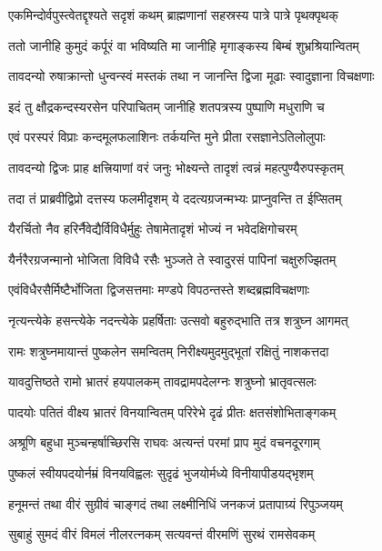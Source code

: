 \twolineshloka
{एकमिन्दोर्वपुस्त्वेतद्दृश्यते सदृशं कथम्}
{ब्राह्मणानां सहस्रस्य पात्रे पात्रे पृथक्पृथक्}%

\twolineshloka
{ततो जानीहि कुमुदं कर्पूरं वा भविष्यति}
{मा जानीहि मृगाङ्कस्य बिम्बं शुभ्रश्रियान्वितम्}%

\twolineshloka
{तावदन्यो रुषाक्रान्तो धुन्वन्स्वं मस्तकं तथा}
{न जानन्ति द्विजा मूढाः स्वादुज्ञाना विचक्षणाः}%

\twolineshloka
{इदं तु क्षौद्रकन्दस्यरसेन परिपाचितम्}
{जानीहि शतपत्रस्य पुष्पाणि मधुराणि च}%

\twolineshloka
{एवं परस्परं विप्राः कन्दमूलफलाशिनः}
{तर्कयन्ति मुने प्रीता रसज्ञानेऽतिलोलुपाः}%

\twolineshloka
{तावदन्यो द्विजः प्राह क्षत्त्रियाणां वरं जनुः}
{भोक्ष्यन्ते तादृशं त्वन्नं महत्पुण्यैरुपस्कृतम्}%

\twolineshloka
{तदा तं प्राब्रवीद्विप्रो दत्तस्य फलमीदृशम्}
{ये ददत्यग्रजन्मभ्यः प्राप्नुवन्ति त ईप्सितम्}%

\twolineshloka
{यैरर्चितो नैव हरिर्नैवेद्यैर्विविधैर्मुहुः}
{तेषामेतादृशं भोज्यं न भवेदक्षिगोचरम्}%

\twolineshloka
{यैर्नरैरग्रजन्मानो भोजिता विविधै रसैः}
{भुञ्जते ते स्वादुरसं पापिनां चक्षुरुज्झितम्}%

\twolineshloka
{एवंविधैरसैर्मिष्टैर्भोजिता द्विजसत्तमाः}
{मण्डपे विपठन्तस्ते शब्दब्रह्मविचक्षणाः}%

\twolineshloka
{नृत्यन्त्येके हसन्त्येके नदन्त्येके प्रहर्षिताः}
{उत्सवो बहुरुद्भाति तत्र शत्रुघ्न आगमत्}%

\twolineshloka
{रामः शत्रुघ्नमायान्तं पुष्कलेन समन्वितम्}
{निरीक्ष्यमुदमुद्भूतां रक्षितुं नाशकत्तदा}%

\twolineshloka
{यावदुत्तिष्ठते रामो भ्रातरं हयपालकम्}
{तावद्रामपदेलग्नः शत्रुघ्नो भ्रातृवत्सलः}%

\twolineshloka
{पादयोः पतितं वीक्ष्य भ्रातरं विनयान्वितम्}
{परिरेभे दृढं प्रीतः क्षतसंशोभिताङ्गकम्}%

\twolineshloka
{अश्रूणि बहुधा मुञ्चन्हर्षाच्छिरसि राघवः}
{अत्यन्तं परमां प्राप मुदं वचनदूरगाम्}%

\twolineshloka
{पुष्कलं स्वीयपदयोर्नम्रं विनयविह्वलः}
{सुदृढं भुजयोर्मध्ये विनीयापीडयद्भृशम्}%

\twolineshloka
{हनूमन्तं तथा वीरं सुग्रीवं चाङ्गदं तथा}
{लक्ष्मीनिधिं जनकजं प्रतापाग्र्यं रिपुञ्जयम्}%

\twolineshloka
{सुबाहुं सुमदं वीरं विमलं नीलरत्नकम्}
{सत्यवन्तं वीरमणिं सुरथं रामसेवकम्}%

